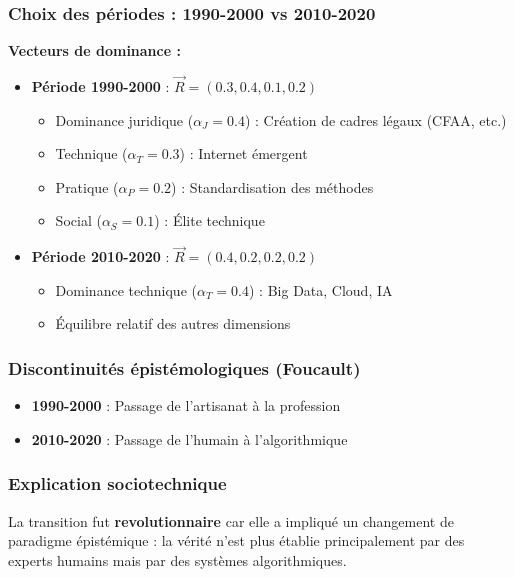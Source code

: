 \documentclass[12pt, a4paper]{article}
\begin{document}
\subsubsection*{Choix des périodes : 1990-2000 vs 2010-2020}

\textbf{Vecteurs de dominance :}

\begin{itemize}
\item \textbf{Période 1990-2000} : \(\vec{R} = (0.3, 0.4, 0.1, 0.2)\)
  \begin{itemize}
  \item Dominance juridique (\(\alpha_J = 0.4\)) : Création de cadres légaux (CFAA, etc.)
  \item Technique (\(\alpha_T = 0.3\)) : Internet émergent
  \item Pratique (\(\alpha_P = 0.2\)) : Standardisation des méthodes
  \item Social (\(\alpha_S = 0.1\)) : Élite technique
  \end{itemize}
  
\item \textbf{Période 2010-2020} : \(\vec{R} = (0.4, 0.2, 0.2, 0.2)\)
  \begin{itemize}
  \item Dominance technique (\(\alpha_T = 0.4\)) : Big Data, Cloud, IA
  \item Équilibre relatif des autres dimensions
  \end{itemize}
\end{itemize}

\subsubsection*{Discontinuités épistémologiques (Foucault)}

\begin{itemize}
\item \textbf{1990-2000} : Passage de l'artisanat à la profession
\item \textbf{2010-2020} : Passage de l'humain à l'algorithmique
\end{itemize}

\subsubsection*{Explication sociotechnique}

La transition fut \textbf{revolutionnaire} car elle a impliqué un changement de paradigme épistémique : la vérité n'est plus établie principalement par des experts humains mais par des systèmes algorithmiques.
\end{document}
